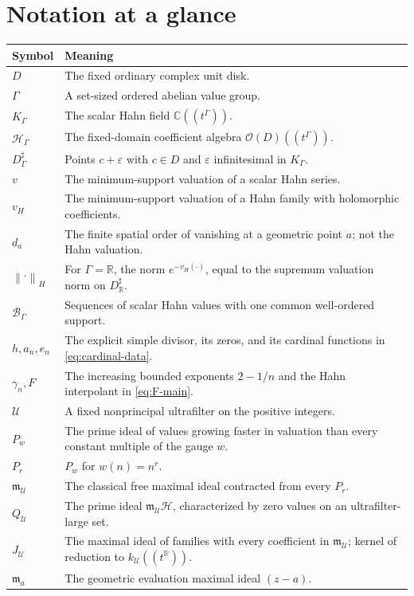 \documentclass[11pt,letterpaper]{article}
\numberwithin{equation}{section}
\theoremstyle{definition}
\theoremstyle{remark}
\newcommand{\C}{\mathbb C}
\newcommand{\R}{\mathbb R}
\newcommand{\OO}{\mathcal O}
\newcommand{\HH}{\mathcal H}
\newcommand{\BB}{\mathcal B}
\newcommand{\UU}{\mathcal U}
\newcommand{\mm}{\mathfrak m}
\newcommand{\vH}{v_{\!H}}
\newcommand{\norm}[1]{\left\lVert#1\right\rVert}
\begin{document}
\section{Notation at a glance}
\begin{longtable}{@{}L{0.25\textwidth}L{0.69\textwidth}@{}}
\toprule
Symbol & Meaning\\
\midrule
\endhead
$D$ & The fixed ordinary complex unit disk.\\
$\Gamma$ & A set-sized ordered abelian value group.\\
$K_\Gamma$ & The scalar Hahn field $\C((t^\Gamma))$.\\
$\HH_\Gamma$ & The fixed-domain coefficient algebra $\OO(D)((t^\Gamma))$.\\
$D^\sharp_\Gamma$ & Points $c+\varepsilon$ with $c\in D$ and
$\varepsilon$ infinitesimal in $K_\Gamma$.\\
$v$ & The minimum-support valuation of a scalar Hahn series.\\
$\vH$ & The minimum-support valuation of a Hahn family with holomorphic
coefficients.\\
$d_a$ & The finite spatial order of vanishing at a geometric point $a$;
not the Hahn valuation.\\
$\norm{\cdot}_H$ & For $\Gamma=\R$, the norm $e^{-\vH(\cdot)}$, equal to
the supremum valuation norm on $D^\sharp_\R$.\\
$\BB_\Gamma$ & Sequences of scalar Hahn values with one common
well-ordered support.\\
$h,a_n,e_n$ & The explicit simple divisor, its zeros, and its cardinal
functions in \eqref{eq:cardinal-data}.\\
$\gamma_n,F$ & The increasing bounded exponents $2-1/n$ and the Hahn
interpolant in \eqref{eq:F-main}.\\
$\UU$ & A fixed nonprincipal ultrafilter on the positive integers.\\
$P_w$ & The prime ideal of values growing faster in valuation than every
constant multiple of the gauge $w$.\\
$P_r$ & $P_w$ for $w(n)=n^r$.\\
$\mm_\UU$ & The classical free maximal ideal contracted from every
$P_r$.\\
$Q_\UU$ & The prime ideal $\mm_\UU\HH$, characterized by zero values
on an ultrafilter-large set.\\
$J_\UU$ & The maximal ideal of families with every coefficient in
$\mm_\UU$; kernel of reduction to $k_\UU((t^\R))$.\\
$\mm_a$ & The geometric evaluation maximal ideal $(z-a)$.\\
\bottomrule
\end{longtable}
\end{document}
